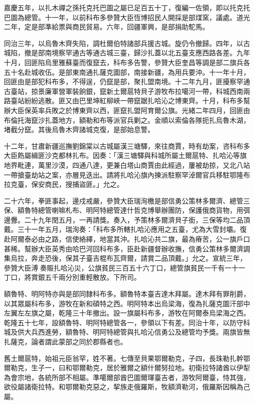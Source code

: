 \begin{pinyinscope}
嘉慶五年，以扎木禪之孫托克托巴圖之屬已足百五十丁，復編一佐領，即以托克托巴圖為總管。十一年，以前科布多參贊大臣恆博招民人開採是部煤窯，議處。道光二年，定是部準給票與商民貿易。六年，回疆軍興，是部捐助駝馬。

同治三年，以烏魯木齊失陷，調杜爾伯特諸部兵援古城。旋仍令撤歸。四年，以古城陷，撤是部南境察罕通古等通古城三臺，歸沙扎蓋以北五臺支應西路各差。九年十月，回匪陷烏里雅蘇臺而復竄去，科布多告警，參贊大臣奎昌等調是部二旗兵各五十名赴城收伍。是部東南通扎薩克圖部，南接新疆，為用兵要沖。十一年十月，回匪由是部犯科布多，不得逞，仍竄是部，聚扎盟南境。十二年九月，匪擾察罕通古臺站，掠景廉軍營軍裝餉銀，竄新土爾扈特貝子游牧布拉噶河一帶，科城西南兩路臺站紛紛逃散。匪又由巴里坤紅柳峽一帶竄踞扎哈沁之博東齊。十月，科布多幫辦大臣保英率兵敗之於博東齊以西，匪竄扎盟阿育爾公旗。光緒二年四月，回匪由布倫托海竄沙扎蓋地方，額勒和布等派官兵剿之。金順以索倫各隊扼扎烏魯木湖，堵截分竄。其後烏魯木齊諸城克復，是部始息警。

十二年，甘肅新疆巡撫劉錦棠以古城屬漢三塘驛，來往商賈，時有劫案，咨科布多大臣飭屬緝匪沙克都林扎布。因奏：「漢三塘驛與科城所屬土爾扈特、扎哈沁等旗地界毗連，萬里沙漠，四通八達，更兼白塔山商賈由此經過，屢被劫掠，又北八站一帶搶臺劫站之案，亦層見迭出。請將扎哈沁旗內揀派駐察罕淖爾官兵移駐鄂隆布拉克臺，保安商民，搜捕盜匪。」允之。

二十六年，拳匪事起，邊戍戒嚴，參贊大臣瑞洵檄是部信勇公策林多爾濟、總管三保、額魯特總管喇嘛札布、明阿特總管達什哲克博舉辦團防，保護俄商貨物，用弭邊釁。二十九年閏五月，一再請獎。奏入，予策林多爾濟貝子銜，三保等均二品頂戴。三十一年五月，瑞洵奏：「科布多所轄扎哈沁應用之五臺，尤為大雪封壩。復赴阿爾泰必由之路，信使絡繹，地當其沖。扎哈沁共二旗，最為瘠苦，公一旗戶口甚稀。幫辦大臣英秀由哈巴河回科布多，臣赴新疆督辦收撫，信勇公策林多爾濟調集烏拉，奔走恐後，保其子臺吉棍布瓦齊爾，請賞二品頂戴。」允之。宣統三年，參贊大臣溥奏賑扎哈沁災，公旗貧民三百五十六丁口，總管旗貧民一千有一十一丁口，將賞銀五千兩分別重輕散放。下所司。

額魯特、明阿特亦與是部同隸科布多。額魯特本臺吉達木拜屬。達木拜有罪削爵，以其眾屬科布多，游牧在新和碩特之西。明阿特本出烏梁海，復為扎薩克圖汗部中左翼左左旗之屬，乾隆三十年撤出。設一旗屬科布多，游牧在阿爾泰烏梁海之西。乾隆五十七年，設額魯特、明阿特總管各一，參領以下有差。同治十年，以防守科城及供大兵西進勞，額魯特、明阿特總管與扎哈沁信勇公及總管均予獎。兩旗皆無扎薩克，論者謂此蒙部之同於郡縣者也。

舊土爾扈特，始祖元臣翁罕，姓不著。七傳至貝果鄂爾勒克，子四，長珠勒扎幹鄂爾勒克，生子一，曰和鄂爾勒克，居於雅爾之額什爾努拉地。初衛拉特諸酋以伊犁為會宗地，各統所部不相屬。準噶爾部酋巴圖爾琿臺吉者，游牧阿爾臺，恃其強，欲役屬諸衛拉特。和鄂爾勒克惡之，挈族走俄羅斯，牧額濟勒河，俄羅斯因稱為己屬。


\end{pinyinscope}
